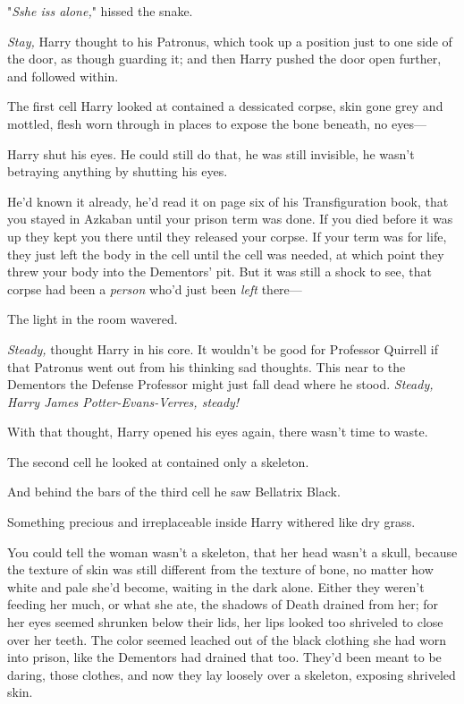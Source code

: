 "\emph{Sshe iss alone,}" hissed the snake.

\emph{Stay,} Harry thought to his Patronus, which took up a position just to 
one side of the door, as though guarding it; and then Harry pushed the door 
open further, and followed within.

The first cell Harry looked at contained a dessicated corpse, skin gone grey 
and mottled, flesh worn through in places to expose the bone beneath, no eyes---

Harry shut his eyes. He could still do that, he was still invisible, he wasn't 
betraying anything by shutting his eyes.

He'd known it already, he'd read it on page six of his Transfiguration book, 
that you stayed in Azkaban until your prison term was done. If you died before 
it was up they kept you there until they released your corpse. If your term was 
for life, they just left the body in the cell until the cell was needed, at 
which point they threw your body into the Dementors' pit. But it was still a 
shock to see, that corpse had been a \emph{person} who'd just been \emph{left} 
there---

The light in the room wavered.

\emph{Steady,} thought Harry in his core. It wouldn't be good for Professor 
Quirrell if that Patronus went out from his thinking sad thoughts. This near to 
the Dementors the Defense Professor might just fall dead where he stood. 
\emph{Steady, Harry James Potter-Evans-Verres, steady!}

With that thought, Harry opened his eyes again, there wasn't time to waste.

The second cell he looked at contained only a skeleton.

And behind the bars of the third cell he saw Bellatrix Black.

Something precious and irreplaceable inside Harry withered like dry grass.

You could tell the woman wasn't a skeleton, that her head wasn't a skull, 
because the texture of skin was still different from the texture of bone, no 
matter how white and pale she'd become, waiting in the dark alone. Either they 
weren't feeding her much, or what she ate, the shadows of Death drained from 
her; for her eyes seemed shrunken below their lids, her lips looked too 
shriveled to close over her teeth. The color seemed leached out of the black 
clothing she had worn into prison, like the Dementors had drained that too. 
They'd been meant to be daring, those clothes, and now they lay loosely over a 
skeleton, exposing shriveled skin.

